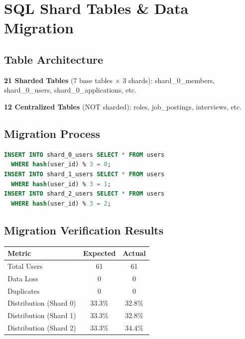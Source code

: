 \documentclass[11pt,a4paper]{article}
\begin{document}
\section{SQL Shard Tables \& Data Migration}

\subsection*{Table Architecture}

\textbf{21 Sharded Tables} (7 base tables $\times$ 3 shards):
shard\_0\_members, shard\_0\_users, shard\_0\_applications, etc.

\textbf{12 Centralized Tables} (NOT sharded): roles, job\_postings, interviews, etc.

\subsection*{Migration Process}

\begin{lstlisting}[language=sql]
INSERT INTO shard_0_users SELECT * FROM users 
  WHERE hash(user_id) % 3 = 0;
INSERT INTO shard_1_users SELECT * FROM users 
  WHERE hash(user_id) % 3 = 1;
INSERT INTO shard_2_users SELECT * FROM users 
  WHERE hash(user_id) % 3 = 2;
\end{lstlisting}

\subsection*{Migration Verification Results}

\begin{center}
\begin{tabular}{|l|c|c|}
\hline
\textbf{Metric} & \textbf{Expected} & \textbf{Actual} \\
\hline
Total Users & 61 & 61 \\
Data Loss & 0 & 0 \\
Duplicates & 0 & 0 \\
Distribution (Shard 0) & 33.3\% & 32.8\% \\
Distribution (Shard 1) & 33.3\% & 32.8\% \\
Distribution (Shard 2) & 33.3\% & 34.4\% \\
\hline
\end{tabular}
\end{center}
\end{document}
